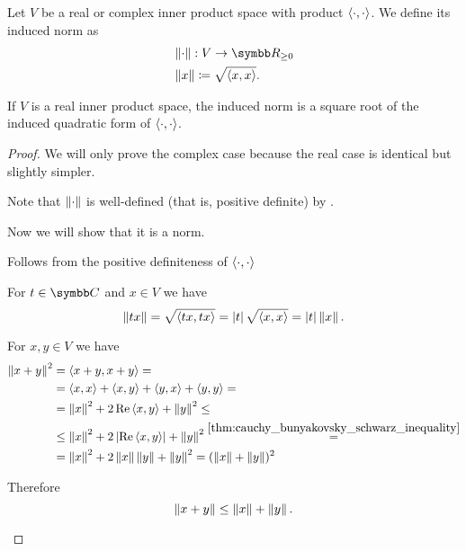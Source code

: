 \begin{definition}\label{def:bilinear_form_induced_norm}
  Let \( V \) be a real or complex inner product space with product \( \left\langle \cdot, \cdot \right\rangle \). We define its induced norm as
  \begin{align*}
    &\Norm \cdot : V \to \BR_{\geq 0} \\
    &\Norm x \coloneqq \sqrt{\Prod x x}.
  \end{align*}

  If \( V \) is a real inner product space, the induced norm is a square root of the induced quadratic form of \( \left\langle \cdot, \cdot \right\rangle \).
\end{definition}
\begin{proof}
  We will only prove the complex case because the real case is identical but slightly simpler.

  Note that \( \left\Vert \cdot \right\Vert \) is well-defined (that is, positive definite) by .

  Now we will show that it is a norm.
  \begin{description}
     Follows from the positive definiteness of \( \left\langle \cdot, \cdot \right\rangle \)

     For \( t \in \BC \) and \( x \in V \) we have
    \begin{equation*}
      \left\Vert tx \right\Vert = \sqrt{\left\langle tx, tx \right\rangle} = \left\vert t \right\vert \sqrt{\left\langle x, x \right\rangle} = \left\vert t \right\vert \left\Vert x \right\Vert.
    \end{equation*}

     For \( x, y \in V \) we have
    \begin{align*}
      \left\Vert x + y \right\Vert^2
      &=
      \left\langle x + y, x + y \right\rangle
      = \\ &=
      \left\langle x, x \right\rangle + \left\langle x, y \right\rangle + \left\langle y, x \right\rangle + \left\langle y, y \right\rangle
      = \\ &=
      \left\Vert x \right\Vert^2 + 2 \operatorname{Re} \left\langle x, y \right\rangle + \left\Vert y \right\Vert^2
      \leq \\ &\leq
      \left\Vert x \right\Vert^2 + 2 \left\vert \operatorname{Re} \left\langle x, y \right\rangle \right\vert + \left\Vert y \right\Vert^2
      \overset {\ref{thm:cauchy_bunyakovsky_schwarz_inequality}} = \\ &=
      \left\Vert x \right\Vert^2 + 2 \left\Vert x \right\Vert \left\Vert y \right\Vert + \left\Vert y \right\Vert^2
      =
      (\left\Vert x \right\Vert + \left\Vert y \right\Vert)^2
    \end{align*}

    Therefore
    \begin{equation*}
      \left\Vert x + y \right\Vert \leq \left\Vert x \right\Vert + \left\Vert y \right\Vert.
    \end{equation*}
  \end{description}
\end{proof}
